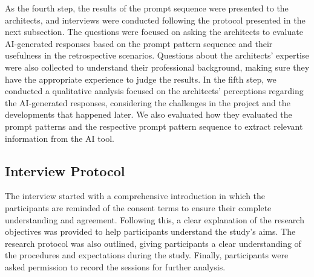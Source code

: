\documentclass[runningheads]{llncs}
\begin{document}
As the fourth step, the results of the prompt sequence were presented to the architects, and interviews were conducted following the protocol presented in the next subsection. The questions were focused on asking the architects to evaluate AI-generated responses based on the prompt pattern sequence and their usefulness in the retrospective scenarios. Questions about the architects’ expertise were also collected to understand their professional background, making sure they have the appropriate experience to judge the results. In the fifth step, we conducted a qualitative analysis focused on the architects' perceptions regarding the AI-generated responses, considering the challenges in the project and the developments that happened later. We also evaluated how they evaluated the prompt patterns and the respective prompt pattern sequence to extract relevant information from the AI tool.






\subsection{Interview Protocol}

The interview started with a comprehensive introduction in which the participants are reminded of the consent terms to ensure their complete understanding and agreement. Following this, a clear explanation of the research objectives was provided to help participants understand the study's aims. The research protocol was also outlined, giving participants a clear understanding of the procedures and expectations during the study. Finally, participants were asked permission to record the sessions for further analysis.
\end{document}
